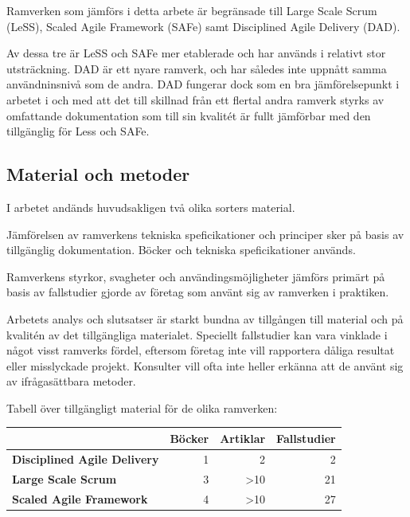 		Ramverken som jämförs i detta arbete är begränsade till Large Scale Scrum (LeSS), Scaled Agile Framework (SAFe) samt Disciplined Agile Delivery (DAD).
		
		Av dessa tre är LeSS och SAFe mer etablerade och har används i relativt stor utsträckning. DAD är ett nyare ramverk, och har således inte uppnått samma användninsnivå som de andra. DAD fungerar dock som en bra jämförelsepunkt i arbetet i och med att det till skillnad från ett flertal andra ramverk styrks av omfattande dokumentation som till sin kvalitét är fullt jämförbar med den tillgänglig för Less och SAFe. \cite{ask_matrix}
		
	
	\subsection{Material och metoder}
		I arbetet andänds huvudsakligen två olika sorters material.
		
		Jämförelsen av ramverkens tekniska speficikationer och principer sker på basis av tillgänglig dokumentation. Böcker och tekniska speficikationer används.
		\linebreak
		
		Ramverkens styrkor, svagheter och användingsmöjligheter jämförs primärt på basis av fallstudier gjorde av företag som använt sig av ramverken i praktiken.
		
		
		
		Arbetets analys och slutsatser är starkt bundna av tillgången till material och på kvalitén av det tillgängliga materialet. Speciellt fallstudier kan vara vinklade i något visst ramverks fördel, eftersom företag inte vill rapportera dåliga resultat eller misslyckade projekt. Konsulter vill ofta inte heller erkänna att de använt sig av ifrågasättbara metoder.
		
		
		Tabell över tillgängligt material för de olika ramverken:
	
		\begin{center}
		\begin{tabular}{ >{\bfseries}l | r | r | r }
			 	 						& Böcker & Artiklar & Fallstudier 	\\ \hline
			Disciplined Agile Delivery 	& 1 	& 2			& 2 			\\ \hline
			Large Scale Scrum 			& 3 	& >10		& 21 			\\ \hline
			Scaled Agile Framework 		& 4 	& >10		& 27 			\\ 
		\end{tabular}
		\end{center}
		
